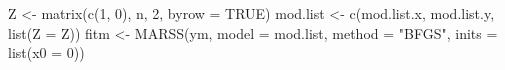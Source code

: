 \begin{Schunk}
\begin{Sinput}
 Z <- matrix(c(1, 0), n, 2, byrow = TRUE)
 mod.list <- c(mod.list.x, mod.list.y, list(Z = Z))
 fitm <- MARSS(ym, model = mod.list, method = "BFGS", inits = list(x0 = 0))
\end{Sinput}
\end{Schunk}
